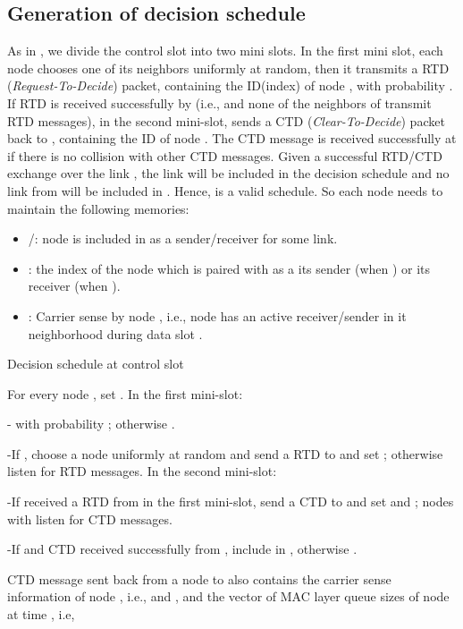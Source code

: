 \documentclass[10pt,onecolumn,draftclsnofoot,journal]{IEEEtran}
\begin{document}
\subsection*{Generation of decision schedule}
As in \cite{srikant2}, we divide the control slot into two mini slots. In the first mini slot, each node  chooses one of its neighbors  uniformly at random, then it transmits a RTD (\textit{Request-To-Decide}) packet, containing the ID(index) of node , with probability . If RTD is received successfully by  (i.e.,  and none of the neighbors of  transmit RTD messages), in the second mini-slot,  sends a CTD (\textit{Clear-To-Decide}) packet back to , containing the ID of node . The CTD message is received successfully at  if there is no collision with other CTD messages. Given a successful RTD/CTD exchange over the link , the link  will be included in the decision schedule  and no link from  will be included in . Hence,  is a valid schedule.
So each node  needs to maintain the following memories:
\begin{itemize}
\item /: node  is included in  as a sender/receiver for some link.
\item : the index of the node which is paired with  as a its sender (when ) or its receiver (when ).
\item : Carrier sense by node , i.e., node  has an active receiver/sender in it neighborhood during data slot .
\end{itemize}
\begin{algorithm}\label{alg dec}
\caption{Decision schedule at control slot  }
\begin{algorithmic}[1]
\STATE For every node , set .
\STATE In the first mini-slot:

-  with probability ; otherwise .

-If , choose a node  uniformly at random and send a RTD to  and set ; otherwise listen for RTD messages.
\STATE In the second mini-slot:

-If received a RTD from  in the first mini-slot, send a CTD to  and set  and ; nodes with  listen for CTD messages.

-If  and CTD received successfully from , include  in , otherwise .

\end{algorithmic}
\end{algorithm}
CTD message sent back from a node  to  also contains the carrier sense information of node , i.e.,  and , and the vector of MAC layer queue sizes of node  at time , i.e, 
\end{document}
